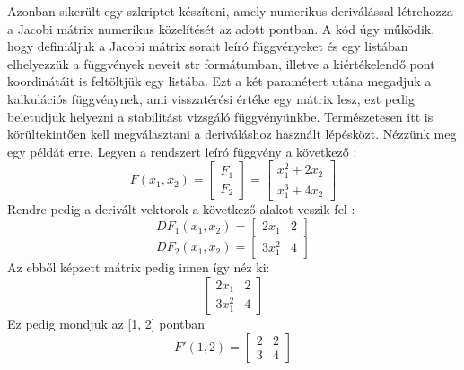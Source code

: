 \documentclass{article}
\theoremstyle{definition}
\theoremstyle{theorem}
\begin{document}
Azonban sikerült egy szkriptet készíteni, amely numerikus deriválással létrehozza a Jacobi mátrix numerikus közelítését az adott pontban. A kód úgy működik, hogy definiáljuk a Jacobi mátrix sorait leíró függvényeket és egy listában elhelyezzük a függvények neveit str formátumban, illetve a kiértékelendő pont koordinátáit is feltöltjük egy listába. Ezt a két paramétert utána megadjuk a kalkulációs függvénynek, ami visszatérési értéke egy mátrix lesz, ezt pedig beletudjuk helyezni a stabilitást vizsgáló függvényünkbe. Természetesen itt is körültekintően kell megválasztani a deriváláshoz használt lépésközt.\newline
Nézzünk meg egy példát erre. Legyen a rendszert leíró függvény a következő :
\begin{equation*}
    F(x_1,x_2) =
        \begin{bmatrix}
            F_1 \\
            F_2
        \end{bmatrix}
        = \begin{bmatrix}
            x_1 ^2 + 2 x_2 \\
            x_1 ^3 + 4 x_2
        \end{bmatrix}
\end{equation*}
Rendre pedig a derivált vektorok a következő alakot veszik fel :
\begin{equation*}
    D F_1(x_1,x_2) = \begin{bmatrix}
        2 x_1 & 2
    \end{bmatrix}
\end{equation*}
\begin{equation*}
    D F_2 (x_1,x_2) = \begin{bmatrix}
        3 x_1^2 & 4
    \end{bmatrix}
\end{equation*}
Az ebből képzett mátrix pedig innen így néz ki:
\begin{equation*}
    \begin{bmatrix}
        2 x_1 & 2 \\
        3 x_1^2 & 4
    \end{bmatrix}
\end{equation*}
Ez pedig mondjuk az [1, 2] pontban
\begin{equation*}
F'(1,2) =
    \begin{bmatrix}
        2 & 2 \\
        3 & 4
    \end{bmatrix}
\end{equation*}
\end{document}
